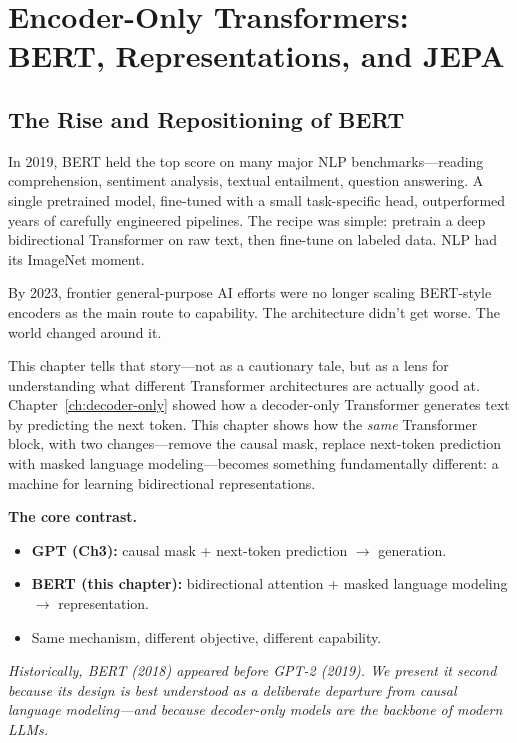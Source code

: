 \chapter[Encoder-Only Transformers: BERT and JEPA]{Encoder-Only Transformers: BERT, Representations, and JEPA}
\label{ch:bert}

\section{The Rise and Repositioning of BERT}

In 2019, BERT held the top score on many major NLP benchmarks---reading comprehension, sentiment analysis, textual entailment, question answering. A single pretrained model, fine-tuned with a small task-specific head, outperformed years of carefully engineered pipelines. The recipe was simple: pretrain a deep bidirectional Transformer on raw text, then fine-tune on labeled data. NLP had its ImageNet moment.

By 2023, frontier general-purpose AI efforts were no longer scaling BERT-style encoders as the main route to capability. The architecture didn't get worse. The world changed around it.

This chapter tells that story---not as a cautionary tale, but as a lens for understanding what different Transformer architectures are actually good at. Chapter~\ref{ch:decoder-only} showed how a decoder-only Transformer generates text by predicting the next token. This chapter shows how the \emph{same} Transformer block, with two changes---remove the causal mask, replace next-token prediction with masked language modeling---becomes something fundamentally different: a machine for learning bidirectional representations.

\begin{quickrecap}
\textbf{The core contrast.}
\begin{itemize}[nosep,leftmargin=1.5em]
  \item \textbf{GPT (Ch3):} causal mask + next-token prediction $\to$ generation.
  \item \textbf{BERT (this chapter):} bidirectional attention + masked language modeling $\to$ representation.
  \item Same mechanism, different objective, different capability.
\end{itemize}
\textit{Historically, BERT (2018) appeared before GPT-2 (2019). We present it second because its design is best understood as a deliberate departure from causal language modeling---and because decoder-only models are the backbone of modern LLMs.}
\end{quickrecap}


